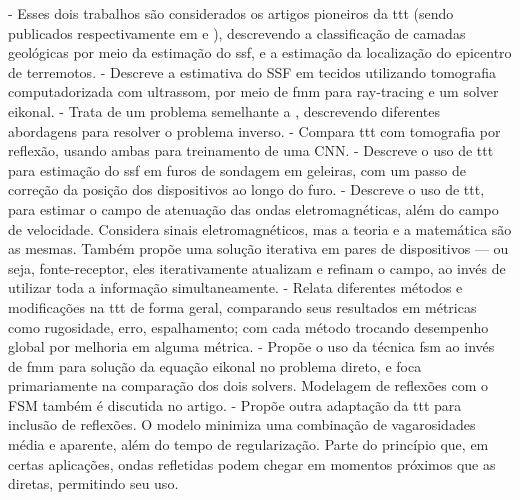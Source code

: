 \begin{itemize}[leftmargin=4pt+]
	 - Esses dois trabalhos são considerados os artigos pioneiros da \gls{ttt} (sendo publicados respectivamente em \citeyear{aki_determination_1976} e \citeyear{aki_determination_1977}), descrevendo a classificação de camadas geológicas por meio da estimação do \gls{ssf}, e a estimação da localização do epicentro de terremotos.
	 - Descreve a estimativa do SSF em tecidos utilizando tomografia computadorizada com ultrassom, por meio de \gls{fmm} para ray-tracing e um solver eikonal.
	 - Trata de um problema semelhante a \cite{ali_opensource_2019}, descrevendo diferentes abordagens para resolver o problema inverso.
	 - Compara \gls{ttt} com tomografia por reflexão, usando ambas para treinamento de uma CNN.   
	 - Descreve o uso de \gls{ttt} para estimação do \gls{ssf} em furos de sondagem em geleiras, com um passo de correção da posição dos dispositivos ao longo do furo.
	 - Descreve o uso de  \gls{ttt}, para estimar o campo de atenuação das ondas eletromagnéticas, além do campo de velocidade. Considera sinais eletromagnéticos, mas a teoria e a matemática são as mesmas. Também propõe uma solução iterativa em pares de dispositivos --- ou seja, fonte-receptor, eles iterativamente atualizam e refinam o campo, ao invés de utilizar toda a informação simultaneamente.
	 - Relata  diferentes métodos e modificações na \gls{ttt} de forma geral, comparando seus resultados em métricas como rugosidade, erro, espalhamento; com cada método trocando desempenho global por melhoria em alguma métrica.
	 - Propõe o uso da técnica \gls{fsm} ao invés de \gls{fmm} para solução da equação eikonal no problema direto, e foca primariamente na comparação dos dois solvers. Modelagem de reflexões com o FSM também é discutida no artigo.
	 - Propõe outra adaptação da \gls{ttt} para inclusão de reflexões. O modelo minimiza uma combinação de vagarosidades média e aparente, além do tempo de regularização. Parte do princípio que, em certas aplicações, ondas refletidas podem chegar em momentos próximos que as diretas, permitindo seu uso.
\end{itemize}

